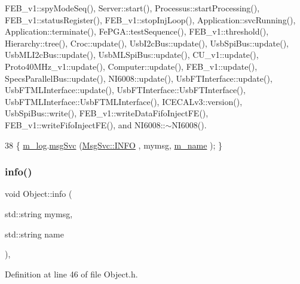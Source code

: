 F\+E\+B\+\_\+v1\+::spy\+Mode\+Seq(), Server\+::start(), Processus\+::start\+Processing(), F\+E\+B\+\_\+v1\+::status\+Register(), F\+E\+B\+\_\+v1\+::stop\+Inj\+Loop(), Application\+::svc\+Running(), Application\+::terminate(), Fe\+P\+G\+A\+::test\+Sequence(), F\+E\+B\+\_\+v1\+::threshold(), Hierarchy\+::tree(), Croc\+::update(), Usb\+I2c\+Bus\+::update(), Usb\+Spi\+Bus\+::update(), Usb\+M\+L\+I2c\+Bus\+::update(), Usb\+M\+L\+Spi\+Bus\+::update(), C\+U\+\_\+v1\+::update(), Proto40\+M\+Hz\+\_\+v1\+::update(), Computer\+::update(), F\+E\+B\+\_\+v1\+::update(), Specs\+Parallel\+Bus\+::update(), N\+I6008\+::update(), Usb\+F\+T\+Interface\+::update(), Usb\+F\+T\+M\+L\+Interface\+::update(), Usb\+F\+T\+Interface\+::\+Usb\+F\+T\+Interface(), Usb\+F\+T\+M\+L\+Interface\+::\+Usb\+F\+T\+M\+L\+Interface(), I\+C\+E\+C\+A\+Lv3\+::version(), Usb\+Spi\+Bus\+::write(), F\+E\+B\+\_\+v1\+::write\+Data\+Fifo\+Inject\+F\+E(), F\+E\+B\+\_\+v1\+::write\+Fifo\+Inject\+F\+E(), and N\+I6008\+::$\sim$\+N\+I6008().


\begin{DoxyCode}
38 \{ \hyperlink{classObject_a0d269813dd7ac1f24bc143031e2963f2}{m\_log}.\hyperlink{classMsgSvc_ad25f18047920cc59a314e5098259711c}{msgSvc} (\hyperlink{classMsgSvc_ae671eb7301996cd049d2da8a65925926ad2fcf3f3e734fc41ee097cc23670ce51}{MsgSvc::INFO}    , mymsg, \hyperlink{classObject_a8b83c95c705d2c3ba0d081fe1710f48d}{m\_name} ); \}
\end{DoxyCode}
\mbox{\label{classObject_a1ca123253dfd30fc28b156f521dcbdae}} 
\subsubsection{\texorpdfstring{info()}{info()}\hspace{0.1cm}{\footnotesize\ttfamily [2/2]}}
{\footnotesize\ttfamily void Object\+::info (\begin{DoxyParamCaption}\item[{std\+::string}]{mymsg,  }\item[{std\+::string}]{name }\end{DoxyParamCaption})\hspace{0.3cm}{\ttfamily [inline]}, {\ttfamily [inherited]}}



Definition at line 46 of file Object.\+h.



